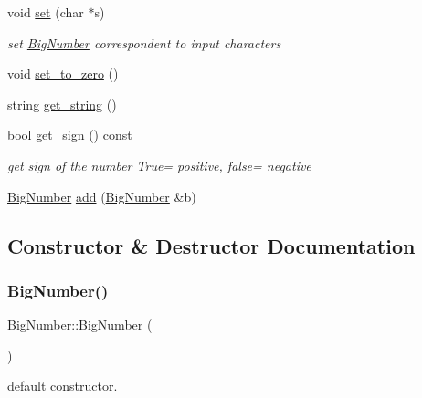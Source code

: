 \begin{DoxyCompactItemize}
void \mbox{\hyperlink{class_big_number_af744b8e9da0e5d99a9e99d2e97ed95a6}{set}} (char $\ast$s)
\begin{DoxyCompactList}\small\item\em set \mbox{\hyperlink{class_big_number}{Big\+Number}} correspondent to input characters \end{DoxyCompactList}\item 
void \mbox{\hyperlink{class_big_number_a0072f79309ab5fd673841fc92ba7cffe}{set\+\_\+to\+\_\+zero}} ()
\item 
string \mbox{\hyperlink{class_big_number_ae2a53447df8a97f9a0e7c75f35e1b7fa}{get\+\_\+string}} ()
\item 
bool \mbox{\hyperlink{class_big_number_a442f2cbf28cdb3f4b282733f5d665bbe}{get\+\_\+sign}} () const
\begin{DoxyCompactList}\small\item\em get sign of the number True= positive, false= negative \end{DoxyCompactList}\item 
\mbox{\hyperlink{class_big_number}{Big\+Number}} \mbox{\hyperlink{class_big_number_a5d0fe42db313ea0f5af3f029422d388d}{add}} (\mbox{\hyperlink{class_big_number}{Big\+Number}} \&b)
\end{DoxyCompactItemize}


\subsection{Constructor \& Destructor Documentation}
\mbox{\label{class_big_number_a0d12fbec476322042ba36e61e1b0db82}} 
\subsubsection{\texorpdfstring{Big\+Number()}{BigNumber()}\hspace{0.1cm}{\footnotesize\ttfamily [1/3]}}
{\footnotesize\ttfamily Big\+Number\+::\+Big\+Number (\begin{DoxyParamCaption}{ }\end{DoxyParamCaption})}



default constructor. 

\mbox{\label{class_big_number_ac6701b663665e17ab6d71df11bc1cc8f}} 
